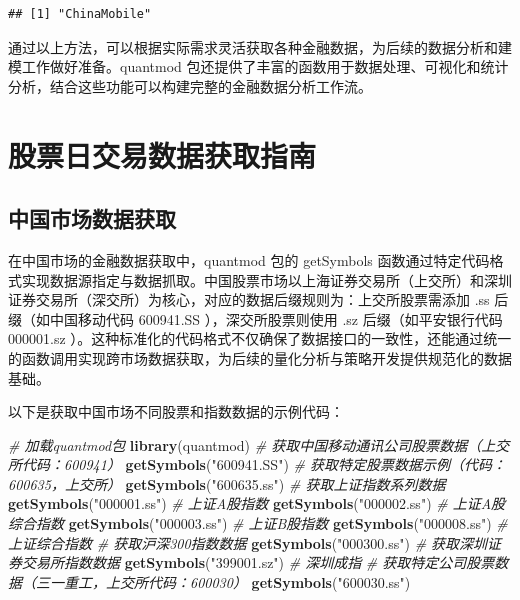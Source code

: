 \documentclass[]{ctexbook}
\newenvironment{Shaded}{\begin{snugshade}}{\end{snugshade}}
\newcommand{\CommentTok}[1]{\textcolor[rgb]{0.56,0.35,0.01}{\textit{#1}}}
\newcommand{\FunctionTok}[1]{\textcolor[rgb]{0.13,0.29,0.53}{\textbf{#1}}}
\newcommand{\NormalTok}[1]{#1}
\newcommand{\StringTok}[1]{\textcolor[rgb]{0.31,0.60,0.02}{#1}}
\begin{document}
\begin{verbatim}
## [1] "ChinaMobile"
\end{verbatim}

通过以上方法，可以根据实际需求灵活获取各种金融数据，为后续的数据分析和建模工作做好准备。quantmod 包还提供了丰富的函数用于数据处理、可视化和统计分析，结合这些功能可以构建完整的金融数据分析工作流。

\section{股票日交易数据获取指南}\label{ux80a1ux7968ux65e5ux4ea4ux6613ux6570ux636eux83b7ux53d6ux6307ux5357}

\subsection{中国市场数据获取}\label{ux4e2dux56fdux5e02ux573aux6570ux636eux83b7ux53d6}

在中国市场的金融数据获取中，quantmod 包的 getSymbols 函数通过特定代码格式实现数据源指定与数据抓取。中国股票市场以上海证券交易所（上交所）和深圳证券交易所（深交所）为核心，对应的数据后缀规则为：上交所股票需添加 .ss 后缀（如中国移动代码 600941.SS ），深交所股票则使用 .sz 后缀（如平安银行代码 000001.sz ）。这种标准化的代码格式不仅确保了数据接口的一致性，还能通过统一的函数调用实现跨市场数据获取，为后续的量化分析与策略开发提供规范化的数据基础。

以下是获取中国市场不同股票和指数数据的示例代码：

\begin{Shaded}
\begin{Highlighting}[]
\CommentTok{\# 加载quantmod包}
\FunctionTok{library}\NormalTok{(quantmod)}
\CommentTok{\# 获取中国移动通讯公司股票数据（上交所代码：600941）}
\FunctionTok{getSymbols}\NormalTok{(}\StringTok{"600941.SS"}\NormalTok{)}
\CommentTok{\# 获取特定股票数据示例（代码：600635，上交所）}
\FunctionTok{getSymbols}\NormalTok{(}\StringTok{"600635.ss"}\NormalTok{)}
\CommentTok{\# 获取上证指数系列数据}
\FunctionTok{getSymbols}\NormalTok{(}\StringTok{"000001.ss"}\NormalTok{)  }\CommentTok{\# 上证A股指数}
\FunctionTok{getSymbols}\NormalTok{(}\StringTok{"000002.ss"}\NormalTok{)  }\CommentTok{\# 上证A股综合指数}
\FunctionTok{getSymbols}\NormalTok{(}\StringTok{"000003.ss"}\NormalTok{)  }\CommentTok{\# 上证B股指数}
\FunctionTok{getSymbols}\NormalTok{(}\StringTok{"000008.ss"}\NormalTok{)  }\CommentTok{\# 上证综合指数}
\CommentTok{\# 获取沪深300指数数据}
\FunctionTok{getSymbols}\NormalTok{(}\StringTok{"000300.ss"}\NormalTok{)}
\CommentTok{\# 获取深圳证券交易所指数数据}
\FunctionTok{getSymbols}\NormalTok{(}\StringTok{"399001.sz"}\NormalTok{)  }\CommentTok{\# 深圳成指}
\CommentTok{\# 获取特定公司股票数据（三一重工，上交所代码：600030）}
\FunctionTok{getSymbols}\NormalTok{(}\StringTok{"600030.ss"}\NormalTok{)}
\end{Highlighting}
\end{Shaded}
\end{document}

